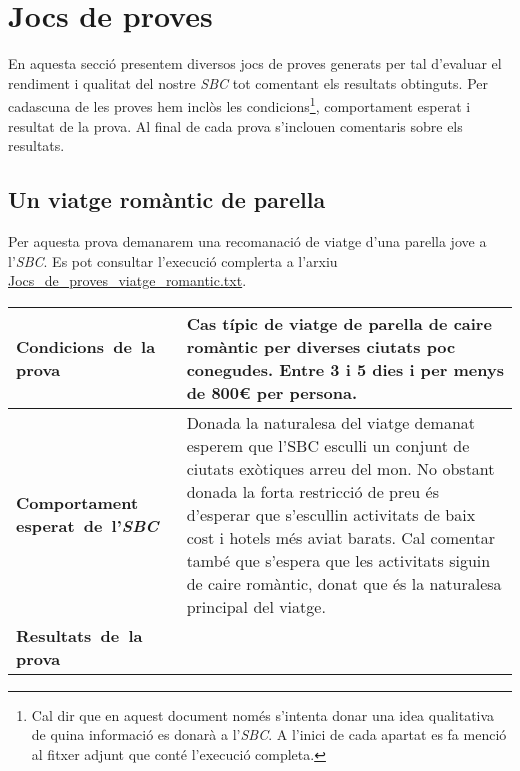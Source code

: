 \documentclass[11pt,a4paper]{article}
\begin{document}
\clearpage

\section{Jocs de proves}
En aquesta secció presentem diversos jocs de proves generats per tal d'evaluar el rendiment i qualitat del nostre \emph{SBC} tot comentant els resultats obtinguts. Per cadascuna de les proves hem inclòs les condicions\footnote{Cal dir que en aquest document només s'intenta donar una idea qualitativa de quina informació es donarà a l'\emph{SBC}. A l'inici de cada apartat es fa menció al fitxer adjunt que conté l'execució completa.}, comportament esperat i resultat de la prova. Al final de cada prova s'inclouen comentaris sobre els resultats.


\subsection{Un viatge romàntic de parella}

Per aquesta prova demanarem una recomanació de viatge d'una parella jove a l'\emph{SBC}. Es pot consultar l'execució complerta a l'arxiu \url{Jocs_de_proves_viatge_romantic.txt}.

\noindent
\begin{tabular}{|p{}|p{}|}
\hline
\textbf{\mbox{Condicions de la} \mbox{prova}} & Cas típic de viatge de parella de caire romàntic per diverses ciutats poc conegudes. Entre 3 i 5 dies i per menys de 800\euro{} per persona.\\
\hline
\textbf{Comportament \mbox{esperat de l'\emph{SBC}}} & Donada la naturalesa del viatge demanat esperem que l'SBC esculli un conjunt de ciutats exòtiques arreu del mon. No obstant donada la forta restricció de preu és d'esperar que s'escullin activitats de baix cost i hotels més aviat barats. Cal comentar també que s'espera que les activitats siguin de caire romàntic, donat que és la naturalesa principal del viatge. \\
\hline
\textbf{\mbox{Resultats de la} \mbox{prova}} & \\
\hline
\end{tabular}
\medskip
\end{document}
